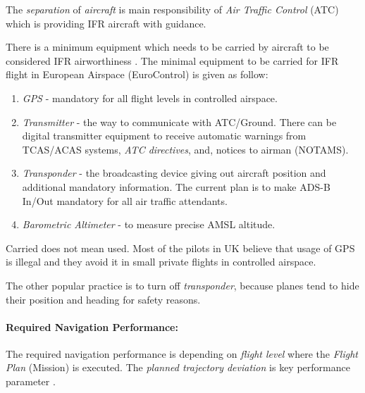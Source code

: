 The \emph{separation} of \emph{aircraft} is main responsibility of \emph{Air Traffic Control} (ATC) which is providing IFR aircraft with guidance.

There is a minimum equipment which needs to be carried by aircraft to be considered IFR airworthiness \cite{icao4444}. The minimal equipment to be carried for IFR flight in European Airspace (EuroControl) is given as follow:
\begin{enumerate}
    \item \emph{GPS} - mandatory for all flight levels in controlled airspace. 
    
    \item \emph{Transmitter} - the way to communicate with ATC/Ground. There can be digital transmitter equipment to receive automatic warnings from TCAS/ACAS systems, \emph{ATC directives}, and, notices to airman (NOTAMS).
    
    \item \emph{Transponder} - the broadcasting device giving out aircraft position and additional mandatory information. The current plan is to make ADS-B In/Out mandatory for all air traffic attendants.
    
    \item \emph{Barometric Altimeter} - to measure precise AMSL altitude.
\end{enumerate}


\begin{note}
    Carried does not mean used. Most of the pilots in UK believe that usage of GPS is illegal and they avoid it in small private flights in controlled airspace.
    
    The other popular practice is to turn off \emph{transponder}, because planes tend to hide their position and heading for safety reasons.
\end{note}

\paragraph{Required Navigation Performance:} The required navigation performance is depending on \emph{flight level} where the \emph{Flight Plan} (Mission) is executed. The \emph{planned trajectory deviation} is key performance parameter \cite{icao4444}.